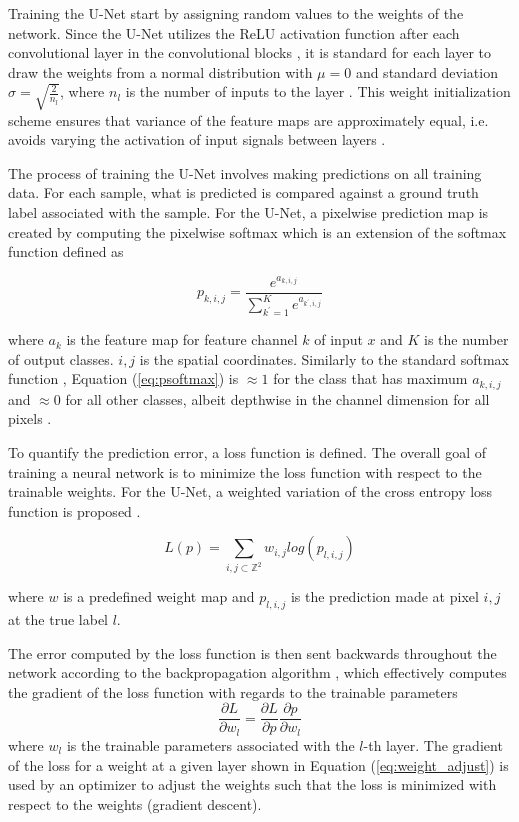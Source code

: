 \documentclass[../main/thesis.tex]{subfiles}
\begin{document}
Training the U-Net start by assigning random values to the weights of the network. Since the U-Net utilizes the ReLU activation function after each convolutional layer in the convolutional blocks \citep{Ronneberger2015}, it is standard for each layer to draw the weights from a normal distribution with $\mu = 0$ and standard deviation $\sigma = \sqrt{\frac{2}{n_l}}$, where $n_l$ is the number of inputs to the layer \citet{He2015}. This weight initialization scheme ensures that variance of the feature maps are approximately equal, i.e. avoids varying the activation of input signals between layers \citet{He2015,Ronneberger2015}.

The process of training the U-Net involves making predictions on all training data. For each sample, what is predicted is compared against a ground truth label associated with the sample. For the U-Net, a pixelwise prediction map is created by computing the pixelwise softmax which is an extension of the softmax function \citep{Bridle1990} defined as 

\begin{equation}
    \label{eq:psoftmax}
    p_{k,i,j} = \frac{e^{a_{k,i,j}}}{\sum_{k^{\prime} = 1}^Ke^{a_{k^\prime,i,j}}}
\end{equation}

where $a_k$ is the feature map for feature channel $k$ of input $x$ and $K$ is the number of output classes. $i,j$ is the spatial coordinates. Similarly to the standard softmax function \citep{Bridle1990}, Equation (\ref{eq:psoftmax}) is $\approx 1$ for the class that has maximum $a_{k,i,j}$ and $\approx 0$ for all other classes, albeit depthwise in the channel dimension for all pixels \citep{Ronneberger2015}.

To quantify the prediction error, a loss function is defined. The overall goal of training a neural network is to minimize the loss function with respect to the trainable weights. For the U-Net, a weighted variation of the cross entropy loss function is proposed \citep{Ronneberger2015}. 

\begin{equation}
    L(p) = \sum_{i,j \subset \mathbb{Z}^2}w_{i,j}log(p_{l,i,j})
\end{equation}

where $w$ is a predefined weight map and $p_{l,i,j}$ is the prediction made at pixel $i,j$ at the true label $l$.

The error computed by the loss function is then sent backwards throughout the network according to the backpropagation algorithm \citep{Rumelhart1986}, which effectively computes the gradient of the loss function with regards to the trainable parameters 
\begin{equation}
    \label{eq:weight_adjust}
    \frac{\partial L}{\partial w_l} = \frac{\partial L}{\partial p}\frac{\partial p}{\partial w_l}
\end{equation}
where $w_l$ is the trainable parameters associated with the $l$-th layer. The gradient of the loss for a weight at a given layer shown in Equation (\ref{eq:weight_adjust}) is used by an optimizer to adjust the weights such that the loss is minimized with respect to the weights (gradient descent).
\end{document}
